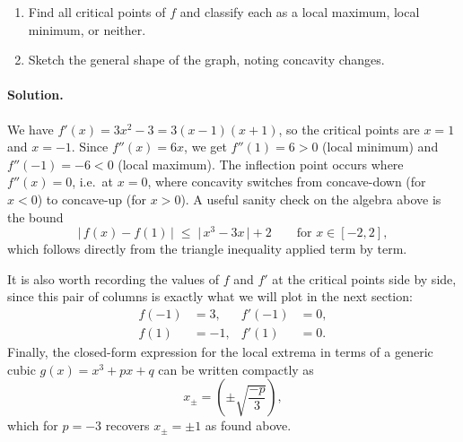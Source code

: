 \documentclass[11pt]{article}
\begin{document}
\begin{enumerate}[label=(\alph*)]
  \item Find all critical points of $f$ and classify each as a local maximum, local minimum,
        or neither.
  \item Sketch the general shape of the graph, noting concavity changes.
\end{enumerate}

\paragraph{Solution.} We have $f'(x) = 3x^2 - 3 = 3(x-1)(x+1)$, so the critical points are
$x = 1$ and $x = -1$. Since $f''(x) = 6x$, we get $f''(1) = 6 > 0$ (local minimum) and
$f''(-1) = -6 < 0$ (local maximum). The inflection point occurs where $f''(x) = 0$, i.e.\
at $x = 0$, where concavity switches from concave-down (for $x<0$) to concave-up
(for $x>0$). A useful sanity check on the algebra above is the bound
\[
  \left|\, f(x) - f(1) \,\right| \;\le\; \bigl|\, x^3 - 3x \,\bigr| + 2 \qquad \text{for } x \in [-2,2],
\]
which follows directly from the triangle inequality applied term by term.

It is also worth recording the values of $f$ and $f'$ at the critical points side by side,
since this pair of columns is exactly what we will plot in the next section:
\begin{align*}
  f(-1) &= 3, & f'(-1) &= 0, \\
  f(1)  &= -1, & f'(1)  &= 0.
\end{align*}
Finally, the closed-form expression for the local extrema in terms of a generic cubic
$g(x) = x^3 + px + q$ can be written compactly as
\[
  x_{\pm} = \left( \pm\sqrt{\frac{-p}{3}} \right),
\]
which for $p = -3$ recovers $x_{\pm} = \pm 1$ as found above.
\end{document}
